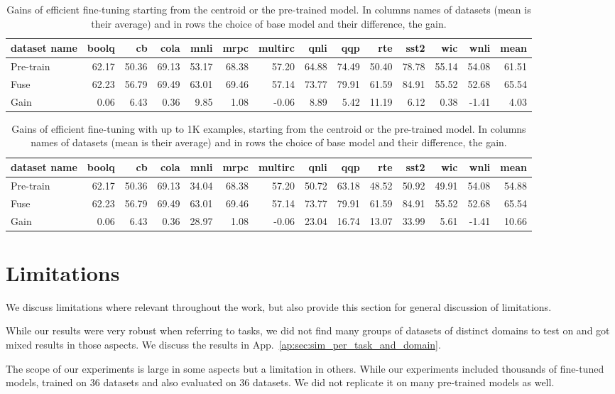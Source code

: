 \documentclass[nohyperref]{article}
\theoremstyle{plain}
\theoremstyle{definition}
\theoremstyle{remark}
\begin{document}
\begin{table}[htb]
    \centering
\small
\begin{tabular}{lrrrrrrrrrrrrr}
\toprule
dataset name & boolq &  cb & cola & mnli & mrpc & multirc & qnli &  qqp &  rte & sst2 &  wic & wnli & mean \\
\midrule
Pre-train & 62.17 & 50.36 & 69.13 & 53.17 & 68.38 &  57.20 & 64.88 & 74.49 & 50.40 & 78.78 & 55.14 & 54.08 & 61.51 \\
Fuse   & 62.23 & 56.79 & 69.49 & 63.01 & 69.46 &  57.14 & 73.77 & 79.91 & 61.59 & 84.91 & 55.52 & 52.68 & 65.54 \\
Gain   &  0.06 & 6.43 & 0.36 & 9.85 & 1.08 &  -0.06 & 8.89 & 5.42 & 11.19 & 6.12 & 0.38 & -1.41 & 4.03 \\
\bottomrule
\end{tabular}
    \caption{Gains of efficient fine-tuning starting from the centroid or the pre-trained model. In columns names of datasets (mean is their average) and in rows the choice of base model and their difference, the gain.}
    \label{tab:efficient}
\end{table}

\begin{table}[htb]
    \centering
\small
\begin{tabular}{lrrrrrrrrrrrrr}
\toprule
dataset name & boolq &  cb & cola & mnli & mrpc & multirc & qnli &  qqp &  rte & sst2 &  wic & wnli & mean \\
\midrule
Pre-train & 62.17 & 50.36 & 69.13 & 34.04 & 68.38 &  57.20 & 50.72 & 63.18 & 48.52 & 50.92 & 49.91 & 54.08 & 54.88 \\
Fuse   & 62.23 & 56.79 & 69.49 & 63.01 & 69.46 &  57.14 & 73.77 & 79.91 & 61.59 & 84.91 & 55.52 & 52.68 & 65.54 \\
Gain   &  0.06 & 6.43 & 0.36 & 28.97 & 1.08 &  -0.06 & 23.04 & 16.74 & 13.07 & 33.99 & 5.61 & -1.41 & 10.66 \\
\bottomrule
\end{tabular}
    \caption{Gains of efficient fine-tuning with up to 1K examples, starting from the centroid or the pre-trained model. In columns names of datasets (mean is their average) and in rows the choice of base model and their difference, the gain.}
    \label{tab:efficient_fs}
\end{table}

\section{Limitations}
We discuss limitations where relevant throughout the work, but also provide this section for general discussion of limitations.

While our results were very robust when referring to tasks, we did not find many groups of datasets of distinct domains to test on and got mixed results in those aspects. We discuss the results in App.~\ref{ap:sec:sim_per_task_and_domain}.

The scope of our experiments is large in some aspects but a limitation in others. While our experiments included thousands of fine-tuned models, trained on 36 datasets and also evaluated on 36 datasets. We did not replicate it on many pre-trained models as well.
\end{document}
